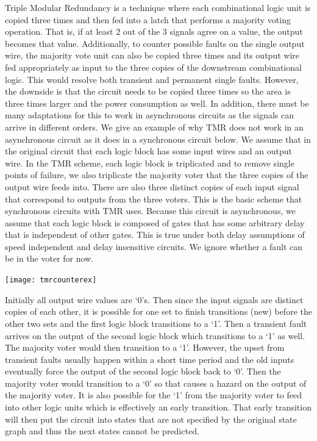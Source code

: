 \documentclass[12pt]{report}
\begin{document}
Triple Modular Redundancy is a technique where each combinational logic unit is copied three times and then fed into a latch that performs a majority voting operation. That is, if at least 2 out of the 3 signals agree on a value, the output becomes that value. Additionally, to counter possible faults on the single output wire, the majority vote unit can also be copied three times and its output wire fed appropriately as input to the three copies of the downstream combinational logic. This would resolve both transient and permanent single faults. However, the downside is that the circuit needs to be copied three times so the area is three times larger and the power consumption as well. In addition, there must be many adaptations for this to work in asynchronous circuits as the signals can arrive in different orders. We give an example of why TMR does not work in an asynchronous circuit as it does in a synchronous circuit below. We assume that in the original circuit that each logic block has some input wires and an output wire. In the TMR scheme, each logic block is triplicated and to remove single points of failure, we also triplicate the majority voter that the three copies of the output wire feeds into. There are also three distinct copies of each input signal that correspond to outputs from the three voters. This is the basic scheme that synchronous circuits with TMR uses. Because this circuit is asynchronous, we assume that each logic block is composed of gates that has some arbitrary delay that is independent of other gates. This is true under both delay assumptions of speed independent and delay insensitive circuits. We ignore whether a fault can be in the voter for now. 
\begin{center}
\texttt{[image: tmrcounterex]}
\end{center}
Initially all output wire values are `0's. Then since the input signals are distinct copies of each other, it is possible for one set to finish transitions (new) before the other two sets and the first logic block transitions to a `1'. Then a transient fault arrives on the output of the second logic block which transitions to a `1' as well. The majority voter would then transition to a `1'. However, the upset from transient faults usually happen within a short time period and the old inputs eventually force the output of the second logic block back to `0'. Then the majority voter would transition to a `0' so that causes a hazard on the output of the majority voter. %
It is also possible for the `1' from the majority voter to feed into other logic units which is effectively an early transition. That early transition will then put the circuit into states that are not specified by the original state graph and thus the next states cannot be predicted.
\\
\end{document}
